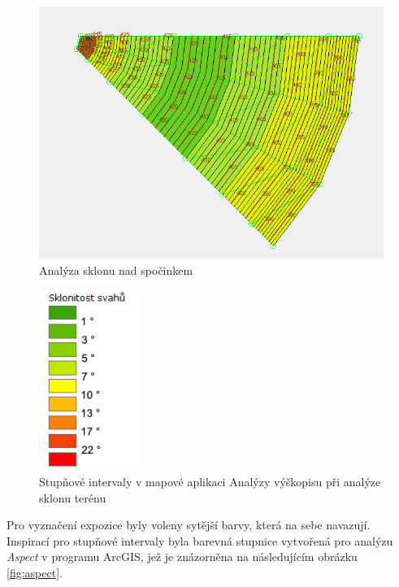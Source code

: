 \documentclass[a4paper,11pt,twoside]{article}
\begin{document}
\vspace{0.2cm}
\begin{figure}[hbt!] 
\begin{center}
\includegraphics[width=15cm]{pictures/slope_gentle_ridge.PNG} 
\caption[Analýza sklonu nad spočinkem]{Analýza sklonu nad spočinkem}
\label{fig:slope_gentle_ridge}
\end{center}
\end{figure}

\begin{figure}[hbt!] 
\begin{center}
\includegraphics[width=3.3cm]{pictures/analyzy_slope.PNG} 
\caption[Stupňové intervaly v mapové aplikaci Analýzy výškopisu při analýze sklonu terénu ]{Stupňové intervaly v mapové aplikaci Analýzy výškopisu při analýze sklonu terénu}
\label{fig:analyzy_slope}
\end{center}
\end{figure}

\newpage
Pro vyznačení expozice byly voleny sytější barvy, která na sebe navazují. Inspirací pro stupňové intervaly byla barevná stupnice vytvořená pro analýzu \textit{Aspect} v programu ArcGIS, jež je znázorněna na následujícím obrázku \ref{fig:aspect}. 
\end{document}
